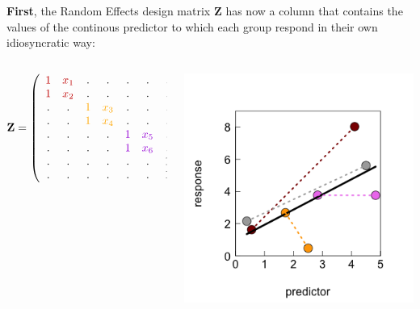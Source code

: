 \documentclass{beamer}
\begin{document}
\begin{frame}
\textbf{First}, the Random Effects design matrix $\mathbf{Z}$ has now a column that contains the values of the continous predictor to which each group respond in their own idiosyncratic way:
    \begin{columns}
        \begin{column}{0.55\textwidth}
        \small
\[
\mathbf{Z} = \left( 
\begin{array}{cccccccc} 
\color{darkred}{1} & \color{darkred}{x_1} & . & . & . & . & . & .\\ 
\color{darkred}{1} & \color{darkred}{x_2} & . & . & . & . & . & .\\ 
. & . & \color{orange}{1} & \color{orange}{x_3} & . & . & . & .\\ 
. & . & \color{orange}{1} & \color{orange}{x_4} & . & . & . & .\\ 
. & . & . & . & \color{violet}{1} & \color{violet}{x_5} & . & .\\ 
. & . & . & . & \color{violet}{1} & \color{violet}{x_6} & . & .\\ 
. & . & . & . & . & . & \color{darkgray}{1} & \color{darkgray}{x_7}\\ 
. & . & . & . & . & . & \color{darkgray}{1} & \color{darkgray}{x_8}
\end{array}\right)
\]
        \end{column}
        \begin{column}{0.45\textwidth}
            \includegraphics[width=\textwidth]{lectures/day_5_theory_of_mems/figures/unnamed-chunk-9-1.png}
        \end{column}
    \end{columns}
\end{frame}
\end{document}
